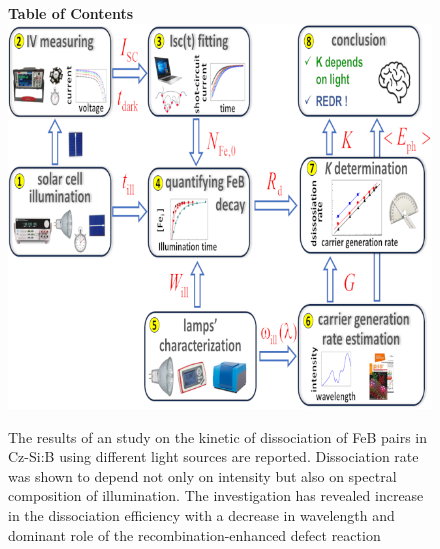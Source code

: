 \documentclass{WileyMSP-template}
\begin{document}
%
%
\begin{figure}
\textbf{Table of Contents}\\
\medskip
  \includegraphics{toc-image.png}
  \medskip
  \caption*{The results of an study on the kinetic of dissociation of FeB pairs in Cz-Si:B using different light sources are reported.
Dissociation rate was shown to depend not only on intensity but also on spectral composition of illumination.
The investigation has revealed increase in the dissociation efficiency with a decrease in wavelength and dominant role of the recombination-enhanced defect reaction}
\end{figure}
\end{document}
